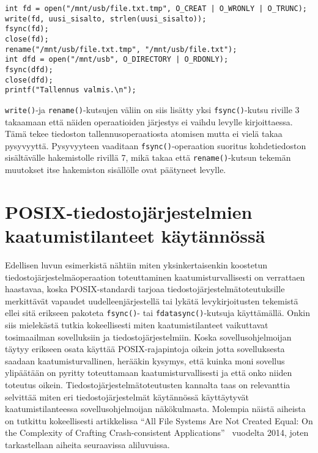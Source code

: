 \begin{verbatim}
int fd = open("/mnt/usb/file.txt.tmp", O_CREAT | O_WRONLY | O_TRUNC);
write(fd, uusi_sisalto, strlen(uusi_sisalto));
fsync(fd);
close(fd);
rename("/mnt/usb/file.txt.tmp", "/mnt/usb/file.txt");
int dfd = open("/mnt/usb", O_DIRECTORY | O_RDONLY);
fsync(dfd);
close(dfd);
printf("Tallennus valmis.\n");
\end{verbatim}
%
\texttt{write()}-ja \texttt{rename()}-kutsujen väliin on siis lisätty yksi \texttt{fsync()}-kutsu riville 3 takaamaan että näiden operaatioiden järjestys ei vaihdu levylle kirjoittaessa.
Tämä tekee tiedoston tallennusoperaatiosta atomisen mutta ei vielä takaa pysyvyyttä.
Pysyvyyteen vaaditaan \texttt{fsync()}-operaation suoritus kohdetiedoston sisältävälle hakemistolle rivillä 7,
mikä takaa että \texttt{rename()}-kutsun tekemän muutokset itse hakemiston sisällölle ovat päätyneet levylle.

\section{POSIX-tiedostojärjestelmien kaatumistilanteet käytännössä}
\label{ChapPosixSafetyStudy}

Edellisen luvun esimerkistä nähtiin miten yksinkertaisenkin koostetun tiedostojärjestelmäoperaation toteuttaminen kaatumisturvallisesti on verrattaen haastavaa,
koska POSIX-standardi tarjoaa tiedostojärjestelmätoteutuksille merkittävät vapaudet uudelleenjärjestellä tai lykätä levykirjoitusten tekemistä ellei sitä erikseen pakoteta \texttt{fsync()}- tai \texttt{fdatasync()}-kutsuja käyttämällä.
Onkin siis mielekästä tutkia kokeellisesti miten kaatumistilanteet vaikuttavat tosimaailman sovelluksiin ja tiedostojärjestelmiin.
Koska sovellusohjelmoijan täytyy erikseen osata käyttää POSIX-rajapintoja oikein jotta sovelluksesta saadaan kaatumisturvallinen,
herääkin kysymys, että kuinka moni sovellus ylipäätään on pyritty toteuttamaan kaatumisturvallisesti ja että onko niiden toteutus oikein.
Tiedostojärjestelmätoteutusten kannalta taas on relevanttia selvittää miten eri tiedostojärjestelmät käytännössä käyttäytyvät kaatumistilanteessa sovellusohjelmoijan näkökulmasta.
Molempia näistä aiheista on tutkittu kokeellisesti artikkelissa ``All File Systems Are Not Created Equal: On the Complexity of Crafting Crash-consistent Applications''~\cite{PosixDataConsistency} vuodelta 2014,
joten tarkastellaan aiheita seuraavissa aliluvuissa.


